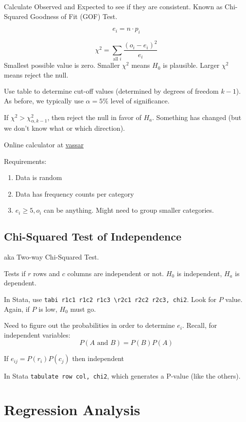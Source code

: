 \documentclass[11pt, oneside]{article}   	%
\begin{document}
Calculate Observed and Expected to see if they are consistent. Known as Chi-Squared Goodness of Fit (GOF) Test.

\[
e_i = n \cdot p_i
\]

\[
\chi^2 = \sum\limits_{\text{all } i} \frac{  (o_i - e_i) ^2} {e_i}
\]
Smallest possible value is zero. Smaller $\chi^2$ means $H_0$ is plausible. Larger $\chi^2$ means reject the null. 

Use table to determine cut-off values (determined by degrees of freedom $k-1$). As before, we typically use $\alpha = 5\%$ level of significance.

If $\chi^2 > \chi_{\alpha, k-1}^2$, then reject the null in favor of $H_a$. Something has changed (but we don't know what or which direction).

Online calculator at \href{http://faculty.vassar.edu/lowry/csfit.html}{vassar}

Requirements:
\begin{enumerate}
\item{Data is random}
\item{Data has frequency counts per category}
\item{$e_i \geq 5, o_i$ can be anything. Might need to group smaller categories.}
\end{enumerate}



\subsection{Chi-Squared Test of Independence}

aka Two-way Chi-Squared Test.

Tests if $r$ rows and $c$ columns are independent or not. $H_0$ is independent, $H_a$ is dependent.

In Stata, use \texttt{tabi r1c1 r1c2 r1c3 \textbackslash r2c1 r2c2 r2c3, chi2}. Look for $P$ value. Again, if $P$ is low, $H_0$ must go.

Need to figure out the probabilities in order to determine $e_i$. Recall, for independent variables:
\[
P(A \text{ and } B) = P(B)P(A)
\]

If $e_{ij} = P(r_i) P(c_j)$ then independent

In Stata \texttt{tabulate row col, chi2}, which generates a P-value (like the others).

\section{Regression Analysis}
\end{document}
